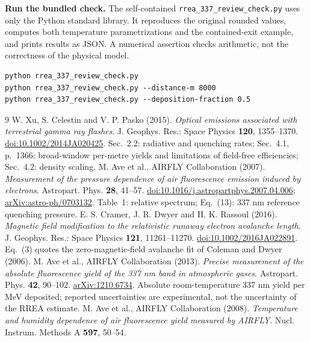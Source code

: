 \documentclass[11pt,a4paper]{article}
\begin{document}
\textbf{Run the bundled check.} The self-contained \texttt{rrea\_337\_review\_check.py} uses only the Python standard library. It reproduces the original rounded values, computes both temperature parametrizations and the contained-exit example, and prints results as JSON. A numerical assertion checks arithmetic, not the correctness of the physical model.
\begin{verbatim}
python rrea_337_review_check.py
python rrea_337_review_check.py --distance-m 8000
python rrea_337_review_check.py --deposition-fraction 0.5
\end{verbatim}

\begingroup
\small
\setlength{\parskip}{2pt}
\begin{thebibliography}{9}
\setlength{\itemsep}{6pt}
W. Xu, S. Celestin and V. P. Pasko (2015).
\emph{Optical emissions associated with terrestrial gamma ray flashes}.
J. Geophys. Res.: Space Physics \textbf{120}, 1355--1370.
\href{https://doi.org/10.1002/2014JA020425}{doi:10.1002/2014JA020425}.
Sec.~2.2: radiative and quenching rates; Sec.~4.1, p.~1366: broad-window per-metre yields and limitations of field-free efficiencies; Sec.~4.2: density scaling.
M. Ave et al., AIRFLY Collaboration (2007).
\emph{Measurement of the pressure dependence of air fluorescence emission induced by electrons}.
Astropart. Phys. \textbf{28}, 41--57.
\href{https://doi.org/10.1016/j.astropartphys.2007.04.006}{doi:10.1016/j.astropartphys.2007.04.006};
\href{https://arxiv.org/abs/astro-ph/0703132}{arXiv:astro-ph/0703132}.
Table~1: relative spectrum; Eq.~(13): 337 nm reference quenching pressure.
E. S. Cramer, J. R. Dwyer and H. K. Rassoul (2016).
\emph{Magnetic field modification to the relativistic runaway electron avalanche length}.
J. Geophys. Res.: Space Physics \textbf{121}, 11261--11270.
\href{https://doi.org/10.1002/2016JA022891}{doi:10.1002/2016JA022891}.
Eq.~(3) quotes the zero-magnetic-field avalanche fit of Coleman and Dwyer (2006).
M. Ave et al., AIRFLY Collaboration (2013).
\emph{Precise measurement of the absolute fluorescence yield of the 337 nm band in atmospheric gases}.
Astropart. Phys. \textbf{42}, 90--102.
\href{https://arxiv.org/abs/1210.6734}{arXiv:1210.6734}.
Absolute room-temperature 337 nm yield per MeV deposited; reported uncertainties are experimental, not the uncertainty of the RREA estimate.
M. Ave et al., AIRFLY Collaboration (2008).
\emph{Temperature and humidity dependence of air fluorescence yield measured by AIRFLY}.
Nucl. Instrum. Methods A \textbf{597}, 50--54.

\end{thebibliography}
\end{document}
